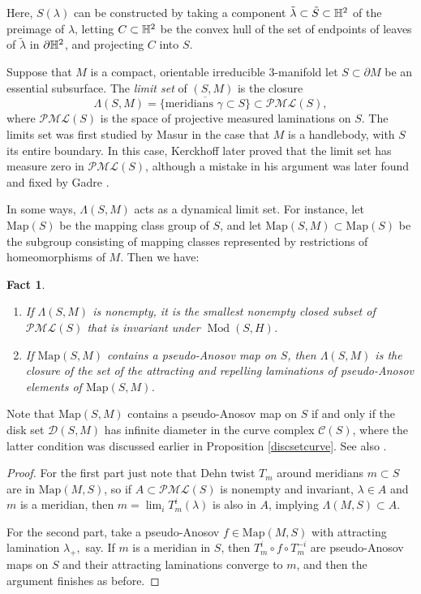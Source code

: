 \documentclass[12pt]{amsart}
\newtheorem{fact}[theorem]{Fact}
\theoremstyle{definition}
\theoremstyle{remark}
\DeclareMathOperator{\Mod}{Mod}
\newcommand{\PML}{{\mathcal P \mathcal M \mathcal L}}
\begin{document}
Here, $S(\lambda)$ can be constructed by taking a component $\tilde \lambda \subset \tilde S \subset \mathbb H^2$ of the preimage of $\lambda$, letting $C\subset \mathbb H^2$ be the convex hull of the set of endpoints of leaves of $\tilde \lambda$ in $\partial \mathbb H^2$, and projecting $C$ into $S$.




Suppose that $M $ is a compact, orientable irreducible $3$-manifold let $S \subset \partial M$ be an essential subsurface. The \emph{limit set} of $(S,M)$ is the closure 
$$\Lambda(S,M)=\overline {\{\text {meridians } \gamma \subset S\}} \subset \PML(S),$$ where $\PML(S)$ is the space of projective measured laminations on $S$.
The limits set was first studied by Masur \cite{Masurmeasured} in the case that $M$ is a handlebody, with $S$ its entire boundary. In this case, Kerckhoff \cite{Kerckhoffmeasure} later proved that the limit set has measure zero in $\PML(S)$, although a mistake in his argument was later found and fixed by Gadre \cite{gadre2011limit}. 

In some ways, $\Lambda(S,M)$ acts as a dynamical limit set. For instance, let $\mathrm{Map}(S)$ be the mapping class group of $S$, and let $\mathrm{Map}(S,M) \subset \mathrm{Map}(S)$ be the subgroup consisting of mapping classes represented by restrictions of homeomorphisms of $M$. Then we have:

\begin{fact}
	\begin{enumerate}
		\item If $\Lambda(S,M)$ is nonempty, it is the smallest nonempty closed subset of $\PML(S) $ that is invariant under $\Mod (S,H) $.
		\item If $\mathrm{Map}(S,M)$ contains a pseudo-Anosov map on $S$, then $\Lambda(S,M)$ is the closure of the set of the attracting and repelling laminations of pseudo-Anosov elements of $\mathrm{Map}(S,M)$.
	\end{enumerate}
\end{fact}

Note that $\mathrm{Map}(S,M)$ contains a pseudo-Anosov map on $S$ if and only if the disk set $\mathcal D(S,M)$ has infinite diameter in the curve complex $\mathcal C(S)$, where the latter condition was discussed earlier in Proposition \ref{discsetcurve}. See also \cite{Biringerextending,Lecuireextension}.

\begin{proof}
For the first part just note that Dehn twist $T_m$ around meridians $m\subset S$ are in $\mathrm{Map}(M,S)$, so if $A \subset\PML(S)$ is nonempty and invariant, $\lambda\in A$ and  $m$ is a meridian, then $m=\lim_i T^i_m(\lambda)$ is also in $A$, implying $\Lambda(M,S)\subset A$.


For the second part, take a pseudo-Anosov $f\in \mathrm{Map}(M,S)$ with attracting lamination $\lambda_+,$ say. If $m$ is a meridian in $S$, then $T_m^i \circ f \circ T^{-i}_m$ are pseudo-Anosov maps on $S$ and their attracting laminations converge to $m$, and then the argument finishes as before.
\end{proof}  
\end{document}
